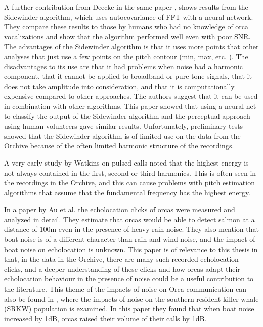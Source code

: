A further contribution from Deecke in the same paper
\cite{deecke1999quantifying}, shows results from the Sidewinder
algorithm, which uses autocovariance of FFT with a neural network.
They compare these results to those by humans who had no knowledge of
orca vocalizations and show that the algorithm performed well even
with poor SNR.  The advantages of the Sidewinder algorithm is that it
uses more points that other analyses that just use a few points on the
pitch contour (min, max, etc. \cite{au2000hearing}).  The
disadvantages to its use are that it had problems when noise had a
harmonic component, that it cannot be applied to broadband or pure
tone signals, that it does not take amplitude into consideration, and
that it is computationally expensive compared to other approaches.
The authors suggest that it can be used in combination with other
algorithms.  This paper showed that using a neural net to classify the
output of the Sidewinder algorithm and the perceptual approach using
human volunteers gave similar results.  Unfortunately, preliminary
tests showed that the Sidewinder algorithm is of limited use on the
data from the Orchive because of the often limited harmonic structure
of the recordings.

A very early study by Watkins \cite{watkins1967harmonic} on pulsed
calls noted that the highest energy is not always contained in the
first, second or third harmonics.  This is often seen in the
recordings in the Orchive, and this can cause problems with pitch
estimation algorithms that assume that the fundamental frequency has
the highest energy.

In a paper by Au et al. \cite{au2004echolocation} the echolocation
clicks of orcas were measured and analyzed in detail.  They estimate
that orcas would be able to detect salmon at a distance of 100m even
in the presence of heavy rain noise.  They also mention that boat
noise is of a different character than rain and wind noise, and the
impact of boat noise on echolocation is unknown.  This paper is of
relevance to this thesis in that, in the data in the Orchive, there
are many such recorded echolocation clicks, and a deeper understanding
of these clicks and how orcas adapt their echolocation behaviour in
the presence of noise could be a useful contribution to the
literature.  This theme of the impacts of noise on Orca communication
can also be found in \cite{holt2009speakingup}, where the impacts of
noise on the southern resident killer whale (SRKW) population is
examined.  In this paper they found that when boat noise increased by
1dB, orcas raised their volume of their calls by 1dB.

